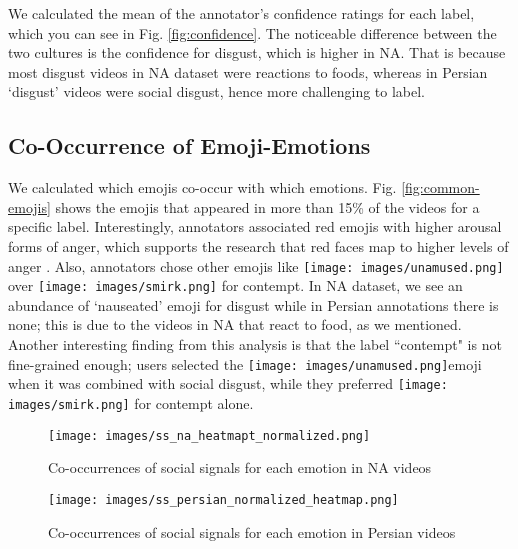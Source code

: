 \documentclass[letterpaper, 10 pt, conference]{ieeeconf}  \usepackage{FG2021}
\begin{document}
We calculated the mean of the annotator’s confidence ratings for each label, which you can see in Fig. \ref{fig:confidence}. The noticeable difference between the two cultures is the confidence for disgust, which is higher in NA. That is because most disgust videos in NA dataset were reactions to foods, whereas in Persian ‘disgust’ videos were social disgust, hence more challenging to label.

\subsection{Co-Occurrence of Emoji-Emotions}
We calculated which emojis co-occur with which emotions. Fig. \ref{fig:common-emojis} shows the emojis that appeared in more than 15\% of the videos for a specific label. Interestingly, annotators associated red emojis with higher arousal forms of anger, which supports the research that red faces map to higher levels of anger \cite{ikeda2020influence}. Also, annotators chose other emojis like \texttt{[image: images/unamused.png]} over \texttt{[image: images/smirk.png]} for contempt. In NA dataset, we see an abundance of ‘nauseated’ emoji for disgust while in Persian annotations there is none; this is due to the videos in NA that react to food, as we mentioned.
Another interesting finding from this analysis is that the label ``contempt" is not fine-grained enough; users selected the \texttt{[image: images/unamused.png]}emoji when it was combined with social disgust, while they preferred \texttt{[image: images/smirk.png]} for contempt alone.



\begin{figure}[t]
\centering
\texttt{[image: images/ss\_na\_heatmapt\_normalized.png]}
\caption{Co-occurrences of social signals for each emotion in NA videos}
\label{fig:ss_emotion_na}
\end{figure}



\begin{figure}[t]
\centering
\texttt{[image: images/ss\_persian\_normalized\_heatmap.png]}
\caption{Co-occurrences of social signals for each emotion in Persian videos}
\label{fig:ss_emotion_persian}
\end{figure}
\end{document}
